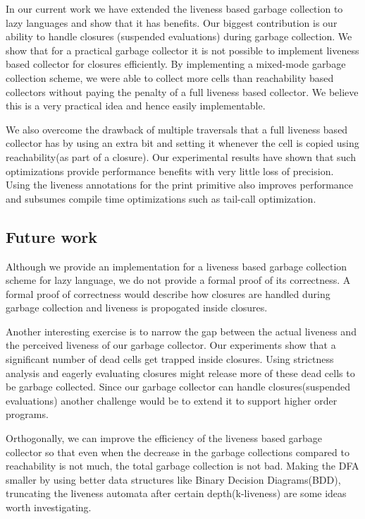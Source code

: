 \documentclass[9pt]{sigplanconf}
\begin{document}
{\color{blue}In our current  work we have extended  the liveness based
  garbage collection to lazy languages  and show that it has benefits.
  Our  biggest   contribution  is  our  ability   to  handle  closures
  (suspended evaluations) during garbage collection.  We show that for
  a  practical  garbage collector  it  is  not possible  to  implement
  liveness based collector for  closures efficiently.  By implementing
  a mixed-mode garbage collection scheme, we were able to collect more
  cells than reachability based  collectors without paying the penalty
  of  a full  liveness based  collector.  We  believe this  is a  very
  practical idea and hence easily implementable.

We  also overcome  the drawback  of  multiple traversals  that a  full
liveness based  collector has  by using  an extra  bit and  setting it
whenever  the  cell   is  copied  using  reachability(as   part  of  a
closure). Our experimental results  have shown that such optimizations
provide performance benefits with very little loss of precision. Using
the  liveness  annotations  for  the  print  primitive  also  improves
performance and subsumes compile  time optimizations such as tail-call
optimization.

\subsection{Future work}
Although we  provide an  implementation for  a liveness  based garbage
collection scheme for lazy language, we  do not provide a formal proof
of its correctness.  A formal  proof of correctness would describe how
closures  are  handled  during  garbage  collection  and  liveness  is
propogated inside closures. 

 Another interesting exercise is to narrow
the gap between the actual liveness  and the perceived liveness of our
garbage collector. Our  experiments show that a  significant number of
dead cells get trapped inside  closures. Using strictness analysis and
eagerly evaluating closures might release  more of these dead cells to
be  garbage  collected.   Since   our  garbage  collector  can  handle
closures(suspended evaluations)  another challenge would be  to extend
it to support higher order programs.

Orthogonally,  we can  improve the  efficiency of  the liveness  based
garbage  collector so  that  even  when the  decrease  in the  garbage
collections compared  to reachability is  not much, the  total garbage
collection is  not bad. Making  the DFA  smaller by using  better data
structures like Binary Decision Diagrams(BDD), truncating the liveness
automata  after   certain  depth(k-liveness)  are  some   ideas  worth
investigating.

 }
\end{document}
